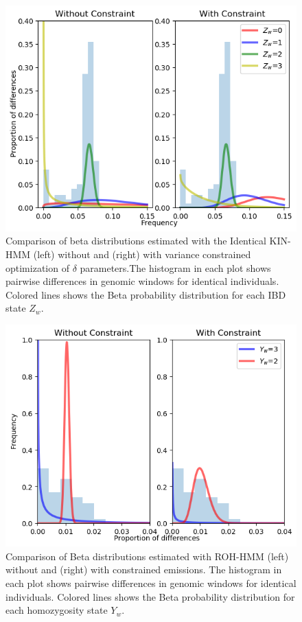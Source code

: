 \documentclass[12pt, letterpaper]{article}
\begin{document}
\begin{figure}[h!]
    \includegraphics[width=18cm]{supplementary_info/plots/contam0_inbred1_run57_coverage0.2_asc0_inputMode_hapProbs_fil0_pair0_15_relid_betaplot.png}
    \centering
    \caption{Comparison of beta distributions estimated with the Identical KIN-HMM (left) without and (right) with variance constrained optimization of $\delta$ parameters.The histogram in each plot shows pairwise differences in genomic windows for identical individuals. Colored lines shows the Beta probability distribution for each IBD state $Z_w$.}
    \label{figS4:bndsbeta}
\end{figure}


\begin{figure}[h!]
    \includegraphics[width=18cm]{supplementary_info/plots/contam0_inbred1_run57_coverage0.2_asc0_inputMode_hapProbs_fil0_ind0_forced_roh.png}
     \centering
    \caption{Comparison of Beta distributions estimated with ROH-HMM (left) without and (right) with constrained emissions. The histogram in each plot shows pairwise differences in genomic windows for identical individuals. Colored lines shows the Beta probability distribution for each homozygosity state $Y_w$.}
    \label{figS5:ROHforced}
\end{figure}
\end{document}
